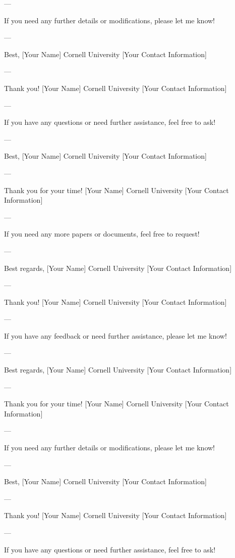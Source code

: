 --- 

If you need any further details or modifications, please let me know! 

--- 

Best,  
[Your Name]  
Cornell University  
[Your Contact Information]  

--- 

Thank you!  
[Your Name]  
Cornell University  
[Your Contact Information]  

--- 

If you have any questions or need further assistance, feel free to ask! 

--- 

Best,  
[Your Name]  
Cornell University  
[Your Contact Information]  

--- 

Thank you for your time!  
[Your Name]  
Cornell University  
[Your Contact Information]  

--- 

If you need any more papers or documents, feel free to request! 

--- 

Best regards,  
[Your Name]  
Cornell University  
[Your Contact Information]  

--- 

Thank you!  
[Your Name]  
Cornell University  
[Your Contact Information]  

--- 

If you have any feedback or need further assistance, please let me know! 

--- 

Best regards,  
[Your Name]  
Cornell University  
[Your Contact Information]  

--- 

Thank you for your time!  
[Your Name]  
Cornell University  
[Your Contact Information]  

--- 

If you need any further details or modifications, please let me know! 

--- 

Best,  
[Your Name]  
Cornell University  
[Your Contact Information]  

--- 

Thank you!  
[Your Name]  
Cornell University  
[Your Contact Information]  

--- 

If you have any questions or need further assistance, feel free to ask! 

